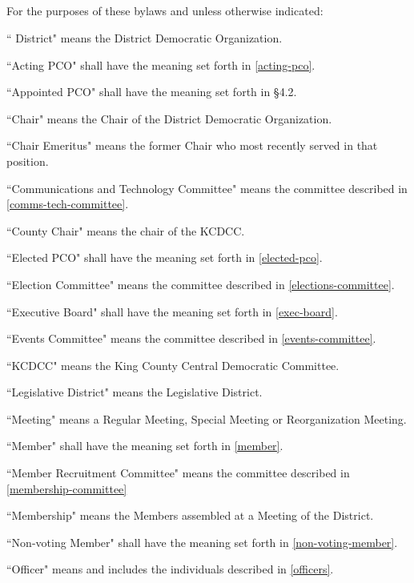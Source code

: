 \subsection{}
For the purposes of these bylaws and unless otherwise indicated:
\begin{alphalist}
    \item `` District" means the \fortythird{} District Democratic Organization.
    \item ``Acting PCO" shall have the meaning set forth in \autoref{acting-pco}.
    \item ``Appointed PCO" shall have the meaning set forth in \S 4.2.
    \item ``Chair" means the Chair of the \fortythird{} District Democratic Organization.
    \item ``Chair Emeritus" means the former Chair who most recently served in that position.
    \item ``Communications and Technology Committee" means the committee described in \autoref{comms-tech-committee}.
    \item ``County Chair" means the chair of the KCDCC.
    \item ``Elected PCO" shall have the meaning set forth in \autoref{elected-pco}.
    \item ``Election Committee" means the committee described in \autoref{elections-committee}.
    \item ``Executive Board" shall have the meaning set forth in \autoref{exec-board}.
    \item ``Events Committee" means the committee described in \autoref{events-committee}.
    \item ``KCDCC" means the King County Central Democratic Committee.
    \item ``Legislative District" means the \fortythird{} Legislative District.
    \item ``Meeting" means a Regular Meeting, Special Meeting or Reorganization Meeting.
    \item ``Member" shall have the meaning set forth in \autoref{member}.
    \item ``Member Recruitment Committee" means the committee described in \autoref{membership-committee}
    \item ``Membership" means the Members assembled at a Meeting of the \fortythird{} District.
    \item ``Non-voting Member" shall have the meaning set forth in \autoref{non-voting-member}.
    \item ``Officer" means and includes the individuals described in \autoref{officers}.

\end{alphalist}
